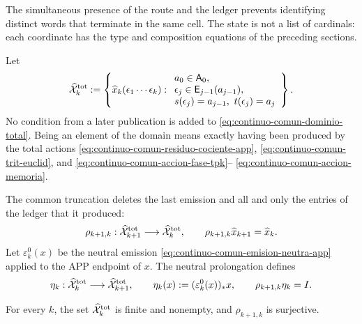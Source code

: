 The simultaneous presence of the route and the ledger prevents identifying
distinct words that terminate in the same cell.  The state is not a list of
cardinals: each coordinate has the type and composition equations of the
preceding sections.

\begin{definition}
\label{def:continuo-comun-dominio-total}
Let
\begin{equation}
\label{eq:continuo-comun-dominio-total}
 \widehat{\mathcal X}^{\rm tot}_k
 :=\left\{
  \widehat x_k(\epsilon_1\cdots\epsilon_k):
  \begin{array}{l}
   a_0\in\mathsf A_0,\\
   \epsilon_j\in\mathsf E_{j-1}(a_{j-1}),\\
   s(\epsilon_j)=a_{j-1},\ t(\epsilon_j)=a_j
  \end{array}
 \right\}.
\end{equation}
No condition from a later publication is added to \eqref{eq:continuo-comun-dominio-total}.
Being an element of the domain means exactly
having been produced by the total actions
\eqref{eq:continuo-comun-residuo-cociente-app},
\eqref{eq:continuo-comun-trit-euclid}, and
\eqref{eq:continuo-comun-accion-fase-tpk}--
\eqref{eq:continuo-comun-accion-memoria}.
\end{definition}

The common truncation deletes the last emission and all and only the entries of the ledger that it produced:
\begin{equation}
\label{eq:continuo-comun-truncamiento-total}
 \rho_{k+1,k}:\widehat{\mathcal X}^{\rm tot}_{k+1}
 \longrightarrow\widehat{\mathcal X}^{\rm tot}_k,
 \qquad
 \rho_{k+1,k}\widehat x_{k+1}
 =\widehat x_k.
\end{equation}
Let \(\varepsilon^0_k(x)\) be the neutral emission
\eqref{eq:continuo-comun-emision-neutra-app} applied to the APP endpoint of
\(x\). The neutral prolongation defines
\begin{equation}
\label{eq:continuo-comun-seccion-total}
 \eta_k:\widehat{\mathcal X}^{\rm tot}_k
 \longrightarrow\widehat{\mathcal X}^{\rm tot}_{k+1},
 \qquad
 \eta_k(x):=(\varepsilon^0_k(x))_*x,
 \qquad
 \rho_{k+1,k}\eta_k=I.
\end{equation}

\begin{proposition}
\label{prop:continuo-comun-total-finito}
For every \(k\), the set
\(\widehat{\mathcal X}^{\rm tot}_k\) is finite and nonempty, and
\(\rho_{k+1,k}\) is surjective.
\end{proposition}

